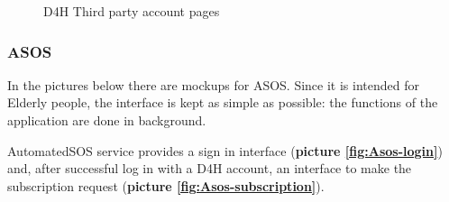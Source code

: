 \begin{figure}[H]
  
  \caption{D4H Third party account pages}
  \label{fig:D4H-third-party-account}
\end{figure}

\subsubsection{ASOS}

In the pictures below there are mockups for ASOS.
Since it is intended for Elderly people, the interface is kept as simple as possible: the functions of the application are done in background.

AutomatedSOS service provides a sign in interface (\textbf{picture \ref{fig:Asos-login}}) and, after successful log in with a D4H account, an interface to make the subscription request (\textbf{picture \ref{fig:Asos-subscription}}).

